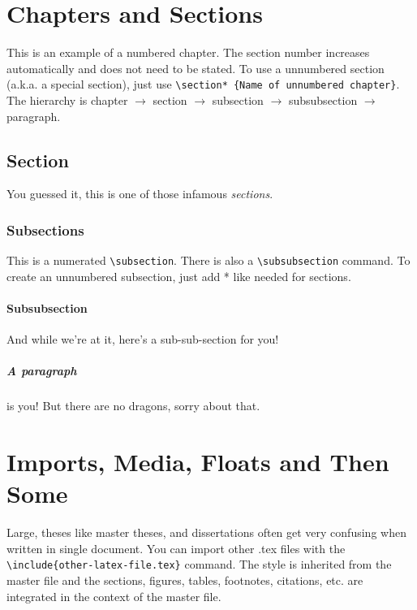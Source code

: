 \documentclass[masterthesis, english]{mas-thesis-chapters} %
\begin{document}
\chapter{Chapters and Sections}

This is an example of a numbered chapter. The section number increases automatically and does not need to be stated. To use a unnumbered section (a.k.a. a special section), just use \texttt{\textbackslash section* \{Name of unnumbered chapter\}}. The hierarchy is chapter $\rightarrow$ section $\rightarrow$ subsection $\rightarrow$ subsubsection $\rightarrow$ paragraph.

\section{Section}

You guessed it, this is one of those infamous \textit{sections}.

\subsection{Subsections}

This is a numerated \texttt{\textbackslash subsection}. There is also a \texttt{\textbackslash subsubsection} command. To create an unnumbered subsection, just add * like needed for sections.

\subsubsection{Subsubsection}

And while we're at it, here's a sub-sub-section for you!

\paragraph{A paragraph} is you! But there are no dragons, sorry about that.



\chapter{Imports, Media, Floats and Then Some}

Large, theses like master theses, and dissertations often get very confusing when written in single document. You can import other .tex files with the\\\texttt{\textbackslash include\{other-latex-file.tex\}} command. The style is inherited from the master file and the sections, figures, tables, footnotes, citations, etc. are integrated in the context of the master file.
\end{document}
